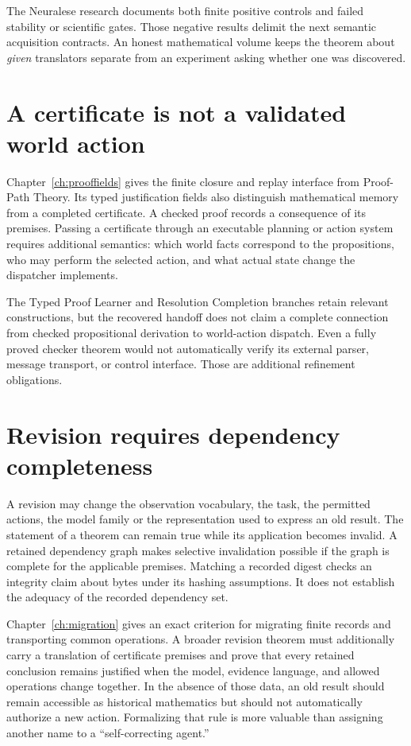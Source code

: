 The Neuralese research documents both finite positive controls and failed stability or scientific gates. Those negative results delimit the next semantic acquisition contracts. An honest mathematical volume keeps the theorem about \emph{given} translators separate from an experiment asking whether one was discovered.

\section{A certificate is not a validated world action}
Chapter~\ref{ch:prooffields} gives the finite closure and replay interface from Proof-Path Theory. Its typed justification fields also distinguish mathematical memory from a completed certificate. A checked proof records a consequence of its premises. Passing a certificate through an executable planning or action system requires additional semantics: which world facts correspond to the propositions, who may perform the selected action, and what actual state change the dispatcher implements.

The Typed Proof Learner and Resolution Completion branches retain relevant constructions, but the recovered handoff does not claim a complete connection from checked propositional derivation to world-action dispatch. Even a fully proved checker theorem would not automatically verify its external parser, message transport, or control interface. Those are additional refinement obligations.

\section{Revision requires dependency completeness}
A revision may change the observation vocabulary, the task, the permitted actions, the model family or the representation used to express an old result. The statement of a theorem can remain true while its application becomes invalid. A retained dependency graph makes selective invalidation possible if the graph is complete for the applicable premises. Matching a recorded digest checks an integrity claim about bytes under its hashing assumptions. It does not establish the adequacy of the recorded dependency set.

Chapter~\ref{ch:migration} gives an exact criterion for migrating finite records and transporting common operations. A broader revision theorem must additionally carry a translation of certificate premises and prove that every retained conclusion remains justified when the model, evidence language, and allowed operations change together. In the absence of those data, an old result should remain accessible as historical mathematics but should not automatically authorize a new action. Formalizing that rule is more valuable than assigning another name to a ``self-correcting agent.''

